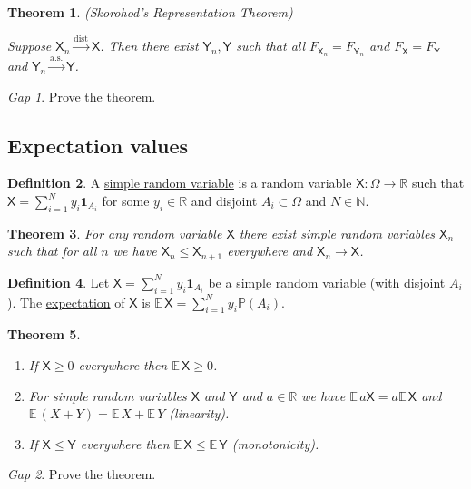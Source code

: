 \documentclass[11pt]{article}
\newcommand{\rv}[1]{\mathsf{#1}}
\newcommand{\p}{\mathbb{P}}
\newcommand{\ex}{\mathbb{E}\,}
\newcommand{\ind}[1]{\mathbf{1}_{#1}}
\newcommand{\defname}[1]{\underline{#1}}
\newcommand{\asto}{\xrightarrow{\text{a.s.}}}
\newcommand{\disto}{\xrightarrow{\text{dist}}}
\newcommand{\NN}{\mathbb{N}}
\newcommand{\RR}{\mathbb{R}}
\theoremstyle{theorem}
\newtheorem{theorem}{Theorem}[section]
\theoremstyle{definition}
\newtheorem{definition}[theorem]{Definition}
\theoremstyle{remark}
\theoremstyle{step}
\theoremstyle{gap}
\newtheorem*{gap}{Gap}
\begin{document}
\begin{theorem}{(Skorohod's Representation Theorem)}\ 

Suppose \(\rv{X}_n \disto \rv{X}\). Then there exist \(\rv{Y}_n, \rv{Y}\) such that all \(F_{\rv{X}_n} = F_{\rv{Y}_n}\) and \(F_\rv{X} = F_\rv{Y}\) and \(\rv{Y}_n \asto \rv{Y}\).
\end{theorem}

\begin{gap}
Prove the theorem.
\end{gap}


\subsection{Expectation values}

\begin{definition}
A \defname{simple random variable} is a random variable \(\rv{X}:\Omega \to \RR\) such that \(\rv{X} = \sum_{i=1}^N y_i \ind{A_i}\) for some \(y_i \in \RR\) and disjoint \(A_i \subset \Omega\) and \(N \in \NN\).
\end{definition}

\begin{theorem}
For any random variable \(\rv{X}\) there exist simple random variables \(\rv{X}_n\) such that for all \(n\) we have \(\rv{X}_n \leq \rv{X}_{n+1}\) everywhere and \(\rv{X}_n \to \rv{X}\).
\end{theorem}

\begin{definition}
Let \(\rv{X} = \sum_{i=1}^N y_i \ind{A_i}\) be a simple random variable (with disjoint \(A_i\)). The \defname{expectation} of \(\rv{X}\) is \(\ex \rv{X} = \sum_{i=1}^N y_i \p(A_i)\).
\end{definition}

\begin{theorem}\ 
\begin{enumerate}
\item If \(\rv{X} \geq 0\) everywhere then \(\ex \rv{X} \geq 0\).
\item For simple random variables \(\rv{X}\) and \(\rv{Y}\) and \(a \in \RR\) we have \(\ex a \rv{X} = a \ex \rv{X}\) and \(\ex (X+Y) = \ex X + \ex Y\) (linearity).
\item If \(\rv{X} \leq \rv{Y}\) everywhere then \(\ex\rv{X} \leq \ex\rv{Y}\) (monotonicity).
\end{enumerate}
\end{theorem}

\begin{gap}
Prove the theorem.
\end{gap}
\end{document}
